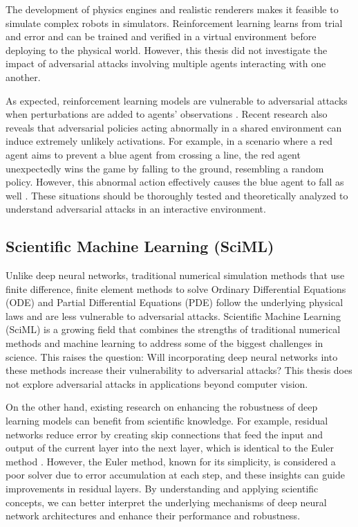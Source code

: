 The development of physics engines and realistic renderers makes it feasible to simulate complex robots in simulators. Reinforcement learning learns from trial and error and can be trained and verified in a virtual environment before deploying to the physical world. However, this thesis did not investigate the impact of adversarial attacks involving multiple agents interacting with one another.

As expected, reinforcement learning models are vulnerable to adversarial attacks when perturbations are added to agents' observations \citep{chen2019adversarial}. Recent research also reveals that adversarial policies acting abnormally in a shared environment can induce extremely unlikely activations. For example, in a scenario where a red agent aims to prevent a blue agent from crossing a line, the red agent unexpectedly wins the game by falling to the ground, resembling a random policy. However, this abnormal action effectively causes the blue agent to fall as well \citep{gleave2021adversarial}. These situations should be thoroughly tested and theoretically analyzed to understand adversarial attacks in an interactive environment.

\subsection{Scientific Machine Learning (SciML)}

Unlike deep neural networks, traditional numerical simulation methods that use finite difference, finite element methods to solve Ordinary Differential Equations (ODE) and Partial Differential Equations (PDE) follow the underlying physical laws and are less vulnerable to adversarial attacks. Scientific Machine Learning (SciML) is a growing field that combines the strengths of traditional numerical methods and machine learning to address some of the biggest challenges in science. This raises the question: Will incorporating deep neural networks into these methods increase their vulnerability to adversarial attacks? This thesis does not explore adversarial attacks in applications beyond computer vision.

On the other hand, existing research on enhancing the robustness of deep learning models can benefit from scientific knowledge. For example, residual networks reduce error by creating skip connections that feed the input and output of the current layer into the next layer, which is identical to the Euler method \citep{chen2018neural}. However, the Euler method, known for its simplicity, is considered a poor solver due to error accumulation at each step, and these insights can guide improvements in residual layers. By understanding and applying scientific concepts, we can better interpret the underlying mechanisms of deep neural network architectures and enhance their performance and robustness.
